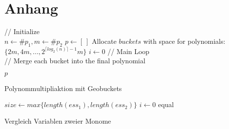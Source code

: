 \chapter{Anhang}




\begin{algorithm}
\SetAlgoLined
{}
// Initialize \\
$n \gets \#p_1, m\gets \#p_2$ \;
$p \gets [\ ]$ \;
Allocate $buckets$ with space for polynomials: $\{2m, 4m, ..., 2^{\lceil log_2(n)\rceil -1 }m\}$\;
$i\gets 0 $\;
// Main Loop \\
// Merge each bucket into the final polynomial\\


\Return $p$

 \caption{Polynommultipliaktion mit Geobuckets}
 \label{algo:mult}
\end{algorithm}



\begin{algorithm}[H]
\label{algo:maxes}
\SetAlgoLined
{}
$size \gets max\{length(ess_1), length(ess_2)\}$\; 
$i \gets 0 $ \;
\Return equal
 \caption{Vergleich Variablen zweier Monome}
\end{algorithm}
